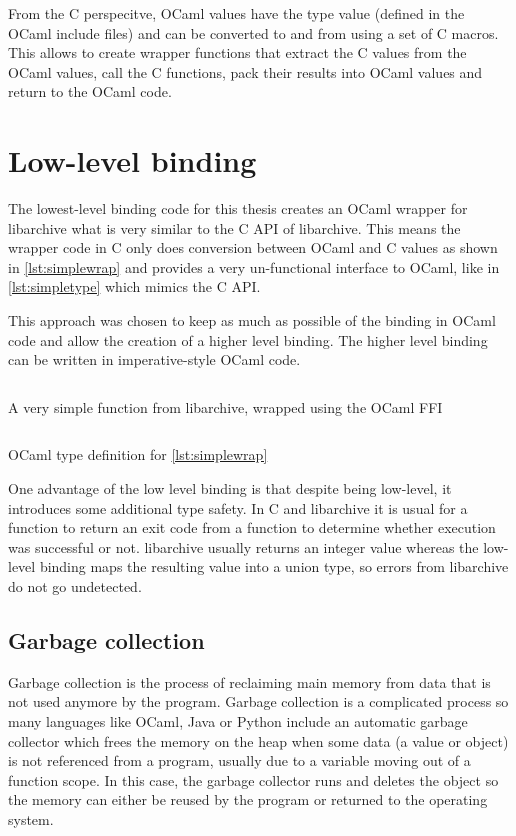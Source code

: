 \documentclass[parskip=half]{scrreprt}
\newcommand\inline[1]{{\addfontfeature{Letters=SmallCaps}#1}}
\begin{document}
From the C perspecitve, OCaml values have the type \inline{value} (defined in
the OCaml include files) and can be converted to and from using a set of C
macros. This allows to create wrapper functions that extract the C values from
the OCaml values, call the C functions, pack their results into OCaml values
and return to the OCaml code.

\section{Low-level binding}
\label{sec:lowlevel}

The lowest-level binding code for this thesis creates an OCaml wrapper for
libarchive what is very similar to the C API of libarchive. This means the
wrapper code in C only does conversion between OCaml and C values as shown in
\autoref{lst:simplewrap} and provides a very un-functional interface to OCaml,
like in \autoref{lst:simpletype} which mimics the C API.

This approach was chosen to keep as much as possible of the binding in OCaml
code and allow the creation of a higher level binding. The higher level binding
can be written in imperative-style OCaml code.

\begin{listing}[h]
  \inputminted[linenos]{c}{simple-wrap.c}
  \caption{A very simple function from libarchive, wrapped using the OCaml FFI}
  \label{lst:simplewrap}
\end{listing}

\begin{listing}[h]
  \inputminted[linenos]{ocaml}{simple-wrap.ml}
  \caption{OCaml type definition for \autoref{lst:simplewrap}}
  \label{lst:simpletype}
\end{listing}

One advantage of the low level binding is that despite being low-level, it
introduces some additional type safety. In C and libarchive it is usual for a
function to return an exit code from a function to determine whether execution
was successful or not. libarchive usually returns an integer value whereas the
low-level binding maps the resulting value into a union type, so errors from
libarchive do not go undetected.

\subsection{Garbage collection}
\label{sec:gc}

Garbage collection is the process of reclaiming main memory from data that is
not used anymore by the program. Garbage collection is a complicated process so
many languages like OCaml, Java or Python include an automatic garbage
collector which frees the memory on the heap when some data (a value or object)
is not referenced from a program, usually due to a variable moving out of a
function scope. In this case, the garbage collector runs and deletes the object
so the memory can either be reused by the program or returned to the operating
system.
\end{document}
